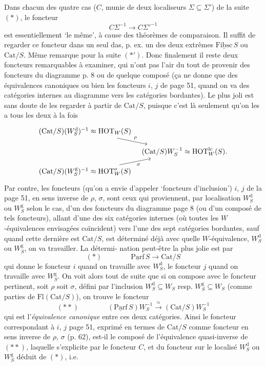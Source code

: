 \documentclass[11pt]{article}
\newcommand{\msp}[1]{\marginpar{\footnotesize [#1]}}
\newcommand{\ul}[1]{\underline{\mathrm{#1}}}
\begin{document}
Dans chacun des quatre cas ($C$, munie de deux localiseurs $\Sigma \subseteq \Sigma'$) de la suite $(*)$, le foncteur
\[C\Sigma^{-1} \longrightarrow C\Sigma'^{-1}\]
est essentiellement ‘le même’, à cause des théorèmes de comparaison. Il suffit de regarder ce foncteur dans un seul das, p. ex. un des deux extrêmes $\ul{Fibsc}\,S$ ou $\mathrm{Cat}/S$. Même remarque pour la suite $(*')$. Donc finalement il reste deux foncteurs remarquables %
\msp{page 62}
à examiner, qui n'ont pas l'air du tout de provenir des foncteurs du diagramme p. 8 ou de quelque composé (ça ne donne que des équivalences canoniques ou bien les foncteurs $i$, $j$ de page 51, quand on va des catégories internes au diagramme vers les catégories bordantes). Le plus joli est sans doute de les regarder à partir de $\mathrm{Cat}/S$, puisque c'est là seulement qu'on les a tous les deux à la fois
\[
\begin{tikzcd}[row sep=small, column sep=tiny]
(\mathrm{Cat}/S)(W_S^{\mathrm{d}})^{-1} \approx \mathrm{HOT}_W(S) \arrow[dr, "\rho"] & \\
& (\mathrm{Cat}/S)W_S^{-1} \approx \mathrm{HOT}_W^{\mathrm{lc}}(S). \\
(\mathrm{Cat}/S)(W_S^{\mathrm{g}})^{-1} \approx \mathrm{HOT}_W^{o}(S) \arrow[ur, "\sigma"'] &
\end{tikzcd}
\]
Par contre, les foncteurs (qu'on a envie d'appeler ‘foncteurs d'inclusion’) $i$, $j$ de la page 51, en sens inverse de $\rho$, $\sigma$, sont ceux qui proviennent, par localisation $W_S^{\mathrm{d}}$ ou $W_S^{\mathrm{g}}$ selon le cas, d'un des foncteurs du diagramme page 8 (ou d'un composé de tels foncteurs), allant d'une des six catégories internes (où toutes les $W$-équivalences envisagées coïncident) vers l'une des sept catégories bordantes, sauf quand cette dernière est $\mathrm{Cat}/S$, est déterminé déjà avec quelle $W$-équivalence, $W_S^{\mathrm{d}}$ ou $W_S^{\mathrm{g}}$, on va travailler. La détermi-\msp{page 63}%
nation peut-être la plus jolie est par
\[(*) \qquad\qquad \ul{Parf}\,S \longrightarrow \mathrm{Cat}/S\]
qui donne le foncteur $i$ quand on travaille avec $W_S^{\mathrm{d}}$, le foncteur $j$ quand on travaille avec $W_S^{\mathrm{g}}$. On voit alors tout de suite que si on compose avec le foncteur pertinent, soit $\rho$ soit $\sigma$, défini par l'inclusion $W_S^{\mathrm{d}} \subseteq W_S$ resp. $W_S^{\mathrm{g}} \subseteq W_S$ (comme parties de $\mathrm{Fl}(\mathrm{Cat}/S)$), on trouve le foncteur
\[(**) \qquad\qquad (\ul{Parf}\,S)W_S^{-1} \xrightarrow{\approx} (\mathrm{Cat}/S)W_S^{-1}\]
qui est l'\textit{équivalence canonique} entre ces deux catégories. Ainsi le foncteur correspondant à $i$, $j$ page 51, exprimé en termes de $\mathrm{Cat}/S$ comme foncteur en sens inverse de $\rho$, $\sigma$ (p. 62), est-il le composé de l'équivalence quasi-inverse de $(**)$, laquelle s'explicite par le foncteur $C$, et du foncteur sur le localisé $W_S^{\mathrm{d}}$ ou $W_S^{\mathrm{g}}$ déduit de $(*)$, i.e.
\end{document}
